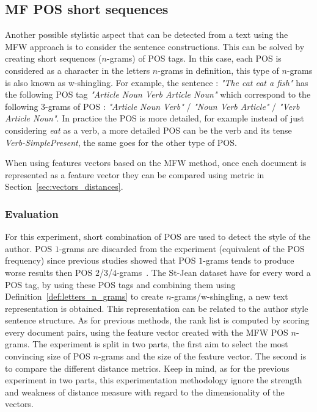 \subsection{MF POS short sequences}

Another possible stylistic aspect that can be detected from a text using the MFW approach is to consider the sentence constructions.
This can be solved by creating short sequences ($n$-grams) of POS tags.
In this case, each POS is considered as a character in the letters $n$-grams in definition, this type of $n$-grams is also known as w-shingling.
For example, the sentence : \textit{"The cat eat a fish"} has the following POS tag \textit{"Article Noun Verb Article Noun"} which correspond to the following 3-grams of POS : \textit{"Article Noun Verb"} / \textit{"Noun Verb Article"} / \textit{"Verb Article Noun"}.
In practice the POS is more detailed, for example instead of just considering \textit{eat} as a verb, a more detailed POS can be the verb and its tense \textit{Verb-SimplePresent}, the same goes for the other type of POS.

When using features vectors based on the MFW method, once each document is represented as a feature vector they can be compared using metric in Section~\ref{sec:vectors_distances}.

\subsubsection{Evaluation}

For this experiment, short combination of POS are used to detect the style of the author.
POS $1$-grams are discarded from the experiment (equivalent of the POS frequency) since previous studies showed that POS $1$-grams tends to produce worse results then POS $2$/$3$/$4$-grams~\cite{kocher_linking}.
The St-Jean dataset have for every word a POS tag, by using these POS tags and combining them using Definition~\ref{def:letters_n_grams} to create $n$-grams/w-shingling, a new text representation is obtained.
This representation can be related to the author style sentence structure.
As for previous methods, the rank list is computed by scoring every document pairs, using the feature vector created with the MFW POS $n$-grams.
The experiment is split in two parts, the first aim to select the most convincing size of POS $n$-grams and the size of the feature vector.
The second is to compare the different distance metrics.
Keep in mind, as for the previous experiment in two parts, this experimentation methodology ignore the strength and weakness of distance measure with regard to the dimensionality of the vectors.

